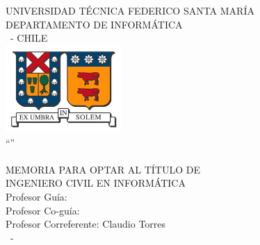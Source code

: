 \begin{titlepage}
\begin{center}
\noindent
{\fontsize{18}{22}\selectfont UNIVERSIDAD TÉCNICA FEDERICO SANTA MARÍA \\}
{\fontsize{16}{19}\selectfont DEPARTAMENTO DE INFORMÁTICA \\}
{\fontsize{16}{19}\selectfont \MakeUppercase{\ciudad}\ - CHILE \\}
\vspace{1.5cm}
\includegraphics[width=4.41cm,height=3.34cm]{logo/logo.jpg} \\
\vspace{1.5cm}
{\fontsize{20}{24}\selectfont ``\MakeUppercase{\titulo}'' \\}
\vfill
{\fontsize{16}{19}\selectfont \MakeUppercase{\nombrealumno} \\}
\vfill
{\fontsize{16}{19}\selectfont MEMORIA PARA OPTAR AL TÍTULO DE \\}
{\fontsize{16}{19}\selectfont INGENIERO CIVIL EN INFORMÁTICA \\}
\vspace{1.5cm}
{\fontsize{14}{17}\selectfont Profesor Guía: \nombreprofesor \\}
{\fontsize{14}{17}\selectfont Profesor Co-guía: \nombrecorreferente \\}
{\fontsize{14}{17}\selectfont Profesor Correferente: Claudio Torres \\}
\vspace{2.5cm}
{\fontsize{14}{17}\selectfont \mesexamen\ - \anioexamen \\}
\end{center}
\end{titlepage}

